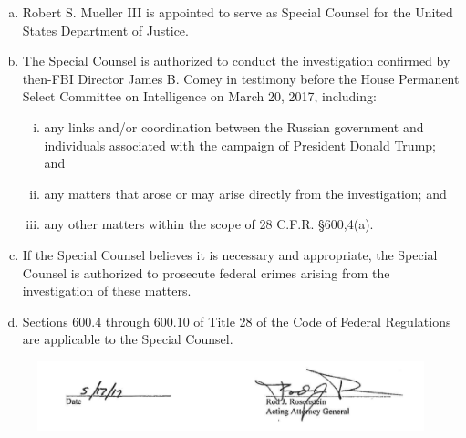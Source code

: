 \begin{enumerate}[(a)]
    \item Robert S. Mueller III is appointed to serve as Special Counsel for the United States Department of Justice.

    \item The Special Counsel is authorized to conduct the investigation confirmed by then-FBI Director James B. Comey in testimony before the House Permanent Select Committee on Intelligence on March 20, 2017, including:

    \begin{enumerate}[(i)]
        \item any links and/or coordination between the Russian government and individuals associated with the campaign of President Donald Trump; and

        \item any matters that arose or may arise directly from the investigation; and

        \item any other matters within the scope of 28 C.F.R. \S 600,4(a).
    \end{enumerate}

    \item If the Special Counsel believes it is necessary and appropriate, the Special Counsel is authorized to prosecute federal crimes arising from the investigation of these matters.

    \item Sections 600.4 through 600.10 of Title 28 of the Code of Federal Regulations are applicable to the Special Counsel.
\end{enumerate}

\begin{figure}[hb]
    \vspace{-20pt}
    \begin{center}
        \includegraphics[width=6in]{images/appendix-a-signature.png}%
    \end{center}
    \vspace{-20pt}
\end{figure}
